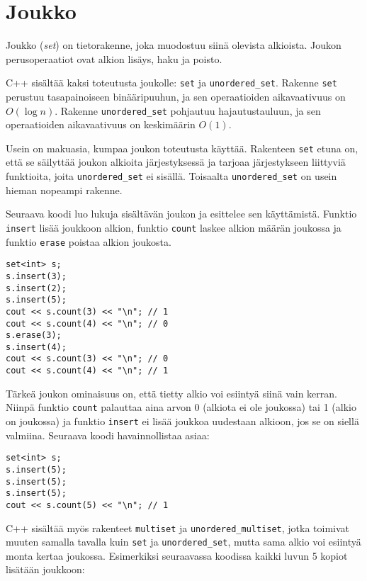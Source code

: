 \section{Joukko}

Joukko (\textit{set}) on tietorakenne,
joka muodostuu siinä olevista alkioista.
Joukon perusoperaatiot ovat alkion lisäys,
haku ja poisto.

C++ sisältää kaksi
toteutusta joukolle: \texttt{set} ja \texttt{unordered\_set}.
Rakenne \texttt{set} perustuu tasapainoiseen
binääripuuhun, ja sen operaatioiden aikavaativuus
on $O(\log n)$.
Rakenne \texttt{unordered\_set} pohjautuu hajautustauluun,
ja sen operaatioiden aikavaativuus on keskimäärin $O(1)$.

Usein on makuasia, kumpaa joukon toteutusta käyttää.
Rakenteen \texttt{set} etuna on, että se säilyttää
joukon alkioita järjestyksessä ja tarjoaa
järjestykseen liittyviä funktioita,
joita \texttt{unordered\_set} ei sisällä.
Toisaalta \texttt{unordered\_set} on usein hieman nopeampi
rakenne.

Seuraava koodi luo lukuja sisältävän joukon ja
esittelee sen käyttämistä.
Funktio \texttt{insert} lisää joukkoon alkion,
funktio \texttt{count} laskee alkion määrän joukossa
ja funktio \texttt{erase} poistaa alkion joukosta.

\begin{lstlisting}
set<int> s;
s.insert(3);
s.insert(2);
s.insert(5);
cout << s.count(3) << "\n"; // 1
cout << s.count(4) << "\n"; // 0
s.erase(3);
s.insert(4);
cout << s.count(3) << "\n"; // 0
cout << s.count(4) << "\n"; // 1
\end{lstlisting}

Tärkeä joukon ominaisuus on,
että tietty alkio voi esiintyä siinä
vain kerran.
Niinpä funktio \texttt{count} palauttaa aina
arvon 0 (alkiota ei ole joukossa) tai 1 (alkio on joukossa)
ja funktio \texttt{insert} ei lisää joukkoa
uudestaan alkioon, jos se on siellä valmiina.
Seuraava koodi havainnollistaa asiaa:

\begin{lstlisting}
set<int> s;
s.insert(5);
s.insert(5);
s.insert(5);
cout << s.count(5) << "\n"; // 1
\end{lstlisting}

C++ sisältää myös rakenteet
\texttt{multiset} ja \texttt{unordered\_multiset},
jotka toimivat muuten samalla tavalla kuin \texttt{set}
ja \texttt{unordered\_set},
mutta sama alkio voi esiintyä
monta kertaa joukossa.
Esimerkiksi seuraavassa koodissa
kaikki luvun 5 kopiot lisätään joukkoon:


